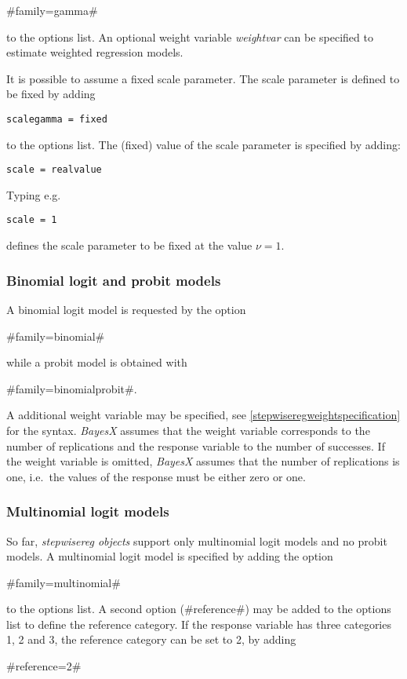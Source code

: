 #family=gamma#

to the options list. An optional weight variable {\em weightvar}
can be specified to estimate weighted regression models.

It is possible to assume a fixed  scale
parameter. The scale parameter is defined to be fixed by adding

{\tt scalegamma = fixed}

to the options list. The (fixed) value of the scale parameter is
specified by adding:

{\tt scale = realvalue}

Typing e.g.

{\tt scale = 1}

defines the scale parameter to be fixed at the value $\nu=1$.


\subsubsection*{Binomial logit and probit models}

A binomial logit model is requested by the option

#family=binomial#

while a probit model is obtained with

#family=binomialprobit#.

A additional weight variable may be specified, see
\autoref{stepwiseregweightspecification} for the syntax. {\em BayesX} assumes
that the weight variable corresponds to the number of replications
and the response variable to the number of successes. If the weight
variable is omitted, {\em BayesX} assumes that the number of
replications is one, i.e.~the values of the response must be either
zero or one.

\subsubsection*{Multinomial logit models}

So far, {\em stepwisereg objects} support only multinomial logit models
and no probit models. A multinomial logit model is specified by adding
the option

#family=multinomial#

to the options list. A second
option (#reference#) may be added to the options list to define the
reference category.  If the response variable has three categories
1, 2 and 3, the reference category can be set to 2, by adding

#reference=2#

